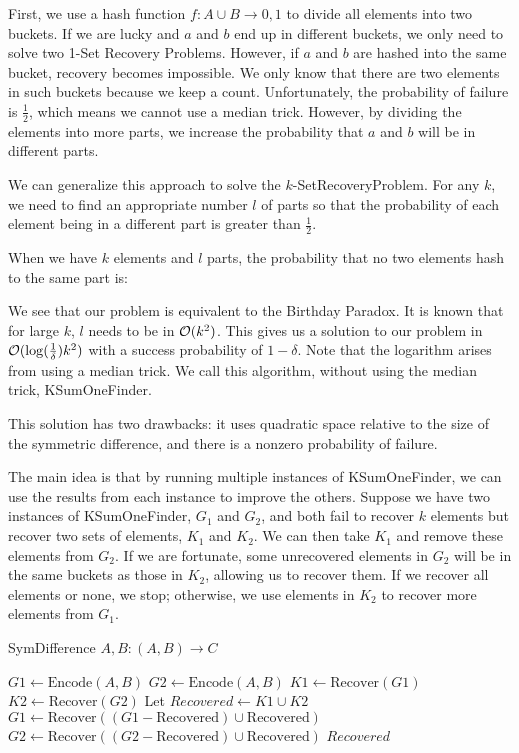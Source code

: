 First, we use a hash function $f: A \cup B \rightarrow {0,1}$ to divide all elements into two buckets. If we are lucky and $a$ and $b$ end up in different buckets, we only need to solve two 1-Set Recovery Problems. However, if $a$ and $b$ are hashed into the same bucket, recovery becomes impossible. We only know that there are two elements in such buckets because we keep a count. Unfortunately, the probability of failure is $\frac{1}{2}$, which means we cannot use a median trick. However, by dividing the elements into more parts, we increase the probability that $a$ and $b$ will be in different parts.

We can generalize this approach to solve the $k$-SetRecoveryProblem. For any $k$, we need to find an appropriate number $l$ of parts so that the probability of each element being in a different part is greater than $\frac{1}{2}$.

When we have $k$ elements and $l$ parts, the probability that no two elements hash to the same part is:

We see that our problem is equivalent to the Birthday Paradox. It is known that for large $k$, $l$ needs to be in $\mathcal{O}(k^2)$. This gives us a solution to our problem in $\mathcal{O}(\log(\frac{1}{\delta}) k^2)$ with a success probability of $1 -\delta$. Note that the logarithm arises from using a median trick. We call this algorithm, without using the median trick, KSumOneFinder.

This solution has two drawbacks: it uses quadratic space relative to the size of the symmetric difference, and there is a nonzero probability of failure.

The main idea is that by running multiple instances of KSumOneFinder, we can use the results from each instance to improve the others. Suppose we have two instances of KSumOneFinder, $G_1$ and $G_2$, and both fail to recover $k$ elements but recover two sets of elements, $K_1$ and $K_2$. We can then take $K_1$ and remove these elements from $G_2$. If we are fortunate, some unrecovered elements in $G_2$ will be in the same buckets as those in $K_2$, allowing us to recover them. If we recover all elements or none, we stop; otherwise, we use elements in $K_2$ to recover more elements from $G_1$.

\begin{algorithm}
\caption{SymDifference $A, B : (A, B) \to C$}
\begin{algorithmic}[1]
\State $G1 \gets \text{Encode}(A, B)$
\State $G2 \gets \text{Encode}(A, B)$
\State $K1 \gets \text{Recover}(G1)$
\State $K2 \gets \text{Recover}(G2)$
\State Let $Recovered \gets K1 \cup K2$
    \State $G1 \gets \text{Recover}((G1 - \text{Recovered}) \cup \text{Recovered})$
    \State $G2 \gets \text{Recover}((G2 - \text{Recovered}) \cup \text{Recovered})$
        \State \Return $Recovered$
    \EndIf
\EndWhile
\end{algorithmic}
\end{algorithm}

